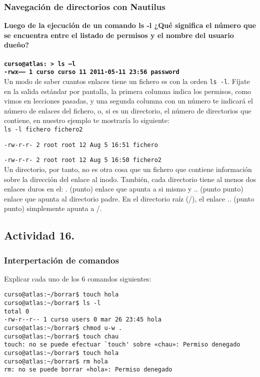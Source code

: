 \documentclass[a4paper,11pt,spanish]{article} %
\newenvironment{myscriptlisting}
{\begin{list}{}{\setlength{\leftmargin}{1em}}\item\scriptsize\bfseries}
{\end{list}}
\begin{document}
\subsubsection{Navegación de directorios con Nautilus}
\textbf{Luego de la ejecución de un comando ls -l ¿Qué significa el número que se 
encuentra entre el listado de permisos y el nombre del usuario dueño?\\ \\
\texttt{curso@atlas:~> ls –l}\\ 
\texttt{-rwx------ 1 curso curso 11 2011-05-11 23:56 password}}\\

Un modo de saber cuantos enlaces tiene un fichero es con la orden \texttt{ls -l}. 
Fíjate en la salida estándar por pantalla, la primera columna indica los permisos, 
como vimos en lecciones pasadas, y una segunda columna con un número te indicará el número 
de enlaces del fichero, o, si es un directorio, el número de directorios que contiene, 
en nuestro ejemplo te mostraría lo siguiente:\\

\texttt{ls -l fichero fichero2}

\texttt{-rw-r-r- 2 root root 12 Aug 5 16:51 fichero}

\texttt{-rw-r-r- 2 root root 12 Aug 5 16:50 fichero2}\\

Un directorio, por tanto, no es otra cosa que un fichero que contiene información sobre la
dirección del enlace al inodo. También, cada directorio tiene al menos dos enlaces duros en 
el: . (punto) enlace que apunta a si mismo y .. (punto punto) enlace que apunta al directorio padre.
En el directorio raíz (/), el enlace .. (punto punto) simplemente apunta a /.

\cite{utlai}

\subsection{Actividad 16.}

\subsubsection{Interpertación de comandos}
Explicar cada uno de los 6 comandos siguientes:

\begin{myscriptlisting}
  \begin{verbatim}
curso@atlas:~/borrar$ touch hola
curso@atlas:~/borrar$ ls -l
total 0
-rw-r--r-- 1 curso users 0 mar 26 23:45 hola
curso@atlas:~/borrar$ chmod u-w .
curso@atlas:~/borrar$ touch chau
touch: no se puede efectuar `touch' sobre «chau»: Permiso denegado
curso@atlas:~/borrar$ touch hola
curso@atlas:~/borrar$ rm hola
rm: no se puede borrar «hola»: Permiso denegado
  \end{verbatim}
\end{myscriptlisting}
\end{document}
